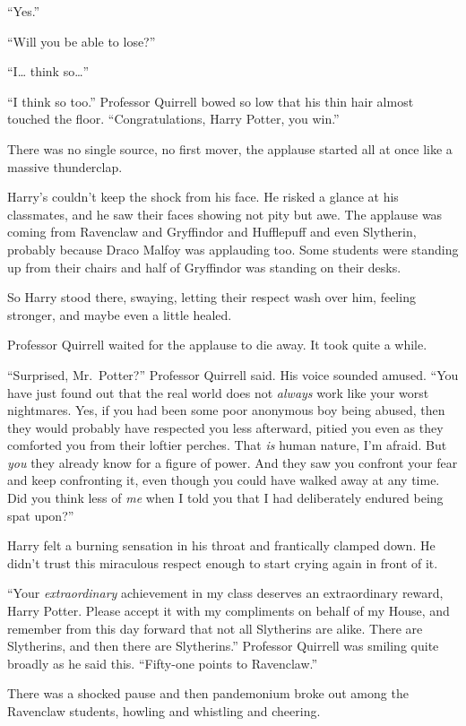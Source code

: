 ``Yes.''

``Will you be able to lose?''

``I\ldots{} think so\ldots{}''

``I think so too.'' Professor Quirrell bowed so low that his thin hair
almost touched the floor. ``Congratulations, Harry Potter, you win.''

There was no single source, no first mover, the applause started all at
once like a massive thunderclap.

Harry's couldn't keep the shock from his face. He risked a glance at his
classmates, and he saw their faces showing not pity but awe. The
applause was coming from Ravenclaw and Gryffindor and Hufflepuff and
even Slytherin, probably because Draco Malfoy was applauding too. Some
students were standing up from their chairs and half of Gryffindor was
standing on their desks.

So Harry stood there, swaying, letting their respect wash over him,
feeling stronger, and maybe even a little healed.

Professor Quirrell waited for the applause to die away. It took quite a
while.

``Surprised, Mr.~Potter?'' Professor Quirrell said. His voice sounded
amused. ``You have just found out that the real world does not
\emph{always} work like your worst nightmares. Yes, if you had been some
poor anonymous boy being abused, then they would probably have respected
you less afterward, pitied you even as they comforted you from their
loftier perches. That \emph{is} human nature, I'm afraid. But \emph{you}
they already know for a figure of power. And they saw you confront your
fear and keep confronting it, even though you could have walked away at
any time. Did you think less of \emph{me} when I told you that I had
deliberately endured being spat upon?''

Harry felt a burning sensation in his throat and frantically clamped
down. He didn't trust this miraculous respect enough to start crying
again in front of it.

``Your \emph{extraordinary} achievement in my class deserves an
extraordinary reward, Harry Potter. Please accept it with my compliments
on behalf of my House, and remember from this day forward that not all
Slytherins are alike. There are Slytherins, and then there are
Slytherins.'' Professor Quirrell was smiling quite broadly as he said
this. ``Fifty-one points to Ravenclaw.''

There was a shocked pause and then pandemonium broke out among the
Ravenclaw students, howling and whistling and cheering.

